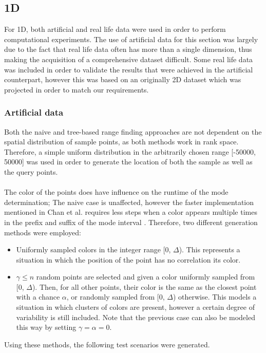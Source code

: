 \documentclass{article}
\begin{document}
\subsection{1D}
For 1D, both artificial and real life data were used in order to perform
computational experiments. The use of artificial data for this section was
largely due to the fact that real life data often has more than a single
dimension, thus making the acquisition of a comprehensive dataset difficult.
Some real life data was included in order to validate the results that were
achieved in the artificial counterpart, however this was based on an originally
2D dataset which was projected in order to match our requirements.
\subsubsection*{Artificial data} Both the naive and tree-based range finding
approaches are not dependent on the spatial distribution of sample points, as
both methods work in rank space. Therefore, a simple uniform distribution in
the arbitrarily chosen range [-50000, 50000] was used in order to generate the
location of both the sample as well as the query points. \\\\ The color of the
points does have influence on the runtime of the mode determination; The naive
case is unaffected, however the faster implementation mentioned in Chan et al.
requires less steps when a color appears multiple times in the prefix and
suffix of the mode interval \cite{Chan2014}. Therefore, two different
generation methods were employed:
\begin{itemize}
    \item Uniformly sampled colors in the integer range [0, $\Delta$). This represents a
          situation in which the position of the point has no correlation its color.
    \item $\gamma \leq n$ random points are selected and given a color uniformly sampled from [0, $\Delta$). Then, for all other points, their color is the same as the closest point with a chance $\alpha$, or randomly sampled from [0, $\Delta$) otherwise. This models a situation in which clusters of colors are present, however a certain degree of variability is still included. Note that the previous case can also be modeled this way by setting $\gamma=\alpha=0$.
\end{itemize}
Using these methods, the following test scenarios were generated. \\
\end{document}
